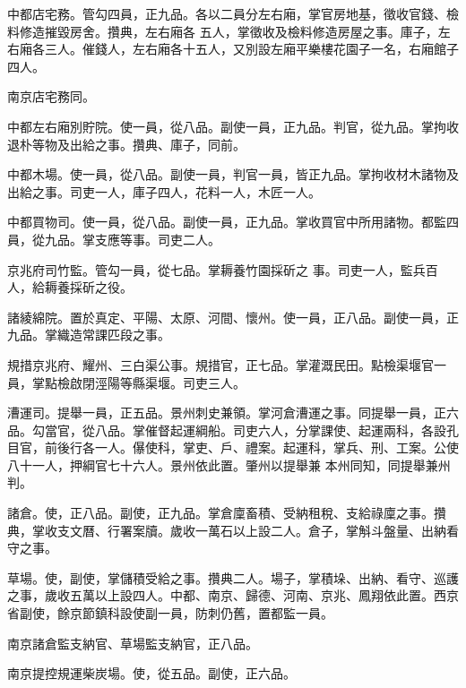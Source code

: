 \begin{pinyinscope}
 中都店宅務。管勾四員，正九品。各以二員分左右廂，掌官房地基，徵收官錢、檢料修造摧毀房舍。攢典，左右廂各
 五人，掌徵收及檢料修造房屋之事。庫子，左右廂各三人。催錢人，左右廂各十五人，又別設左廂平樂樓花園子一名，右廂館子四人。



 南京店宅務同。



 中都左右廂別貯院。使一員，從八品。副使一員，正九品。判官，從九品。掌拘收退朴等物及出給之事。攢典、庫子，同前。



 中都木場。使一員，從八品。副使一員，判官一員，皆正九品。掌拘收材木諸物及出給之事。司吏一人，庫子四人，花料一人，木匠一人。



 中都買物司。使一員，從八品。副使一員，正九品。掌收買官中所用諸物。都監四員，從九品。掌支應等事。司吏二人。



 京兆府司竹監。管勾一員，從七品。掌耨養竹園採斫之
 事。司吏一人，監兵百人，給耨養採斫之役。



 諸綾綿院。置於真定、平陽、太原、河間、懷州。使一員，正八品。副使一員，正九品。掌織造常課匹段之事。



 規措京兆府、耀州、三白渠公事。規措官，正七品。掌灌溉民田。點檢渠堰官一員，掌點檢啟閉涇陽等縣渠堰。司吏三人。



 漕運司。提舉一員，正五品。景州刺史兼領。掌河倉漕運之事。同提舉一員，正六品。勾當官，從八品。掌催督起運綱船。司吏六人，分掌課使、起運兩科，各設孔目官，前後行各一人。儤使科，掌吏、戶、禮案。起運科，掌兵、刑、工案。公使八十一人，押綱官七十六人。景州依此置。肇州以提舉兼
 本州同知，同提舉兼州判。



 諸倉。使，正八品。副使，正九品。掌倉廩畜積、受納租稅、支給祿廩之事。攢典，掌收支文曆、行署案牘。歲收一萬石以上設二人。倉子，掌斛斗盤量、出納看守之事。



 草場。使，副使，掌儲積受給之事。攢典二人。場子，掌積垛、出納、看守、巡護之事，歲收五萬以上設四人。中都、南京、歸德、河南、京兆、鳳翔依此置。西京省副使，餘京節鎮科設使副一員，防刺仍舊，置都監一員。



 南京諸倉監支納官、草場監支納官，正八品。



 南京提控規運柴炭場。使，從五品。副使，正六品。




\end{pinyinscope}
